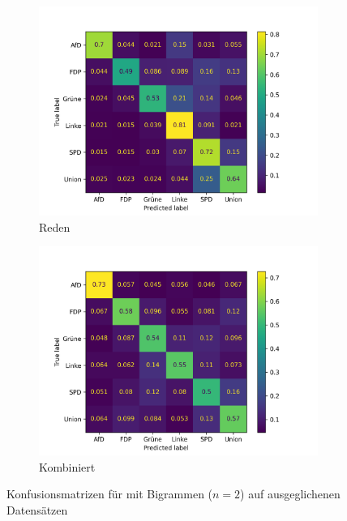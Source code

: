 \begin{figure}[H]
\begin{subfigure}{0.49\textwidth}
      \includegraphics[width=\textwidth]{data/images/modeling/fasttext/under/speeches_confusion_matrix.png}
      \caption{Reden} \label{sfig:confusionMatrixFastTextSpeeches}
    \end{subfigure}
    \hfill
    \begin{subfigure}{0.49\textwidth}
      \includegraphics[width=\textwidth]{data/images/modeling/fasttext/under/all_confusion_matrix.png}
      \caption{Kombiniert} \label{sfig:confusionMatrixFastTextAll}
    \end{subfigure}
    \caption{Konfusionsmatrizen für \ft mit Bigrammen (\(n = \num{2}\)) auf ausgeglichenen Datensätzen} \label{fig:confusionMatrixFastText}
\end{figure}

